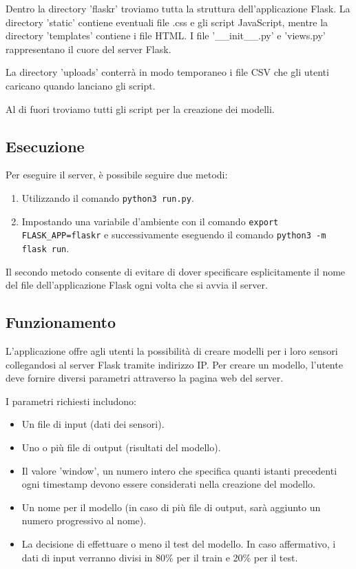 \documentclass[a4paper,10pt]{article}
\begin{document}
Dentro la directory 'flaskr' troviamo tutta la struttura dell'applicazione Flask. La directory 'static' contiene eventuali file .css e gli script JavaScript, mentre la directory 'templates' contiene i file HTML. I file '\_\_init\_\_.py' e 'views.py' rappresentano il cuore del server Flask.

La directory 'uploads' conterrà in modo temporaneo i file CSV che gli utenti caricano quando lanciano gli script. 

Al di fuori troviamo tutti gli script per la creazione dei modelli.



\subsection{Esecuzione}
Per eseguire il server, è possibile seguire due metodi:

\begin{enumerate}
  \item Utilizzando il comando \texttt{python3 run.py}.
  \item Impostando una variabile d'ambiente con il comando \texttt{export FLASK\_APP=flaskr} e successivamente eseguendo il comando \texttt{python3 -m flask run}.
\end{enumerate}

Il secondo metodo consente di evitare di dover specificare esplicitamente il nome del file dell'applicazione Flask ogni volta che si avvia il server.

\subsection{Funzionamento}
L'applicazione offre agli utenti la possibilità di creare modelli per i loro sensori collegandosi al server Flask tramite indirizzo IP. Per creare un modello, l'utente deve fornire diversi parametri attraverso la pagina web del server.

I parametri richiesti includono:
\begin{itemize}
  \item Un file di input (dati dei sensori).
  \item Uno o più file di output (risultati del modello).
  \item Il valore 'window', un numero intero che specifica quanti istanti precedenti ogni timestamp devono essere considerati nella creazione del modello.
  \item Un nome per il modello (in caso di più file di output, sarà aggiunto un numero progressivo al nome).
  \item La decisione di effettuare o meno il test del modello. In caso affermativo, i dati di input verranno divisi in 80\% per il train e 20\% per il test.
\end{itemize}
\end{document}
